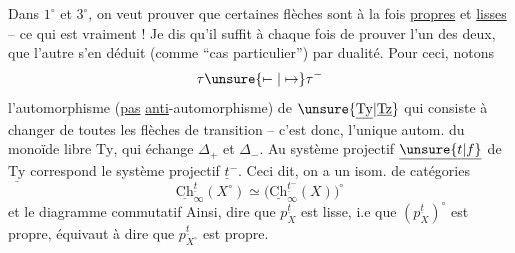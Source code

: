 Dans $1^\circ$ et $3^\circ$, on veut prouver que certaines flèches
 sont à la fois \uline{propres} et \uline{lisses} -- ce qui est vraiment
 ! Je dis qu'il suffit à chaque fois de
prouver l'un des deux, que l'autre s'en déduit
(comme ``cas particulier'') par dualité. Pour ceci,
notons
\[
\tau\unsure{\mapstochar\relbar|\mapsto}\tau^{-}
\]
l'automorphisme (\uline{pas} \uline{anti}-automorphisme) de
$\unsure{\underline{\mathrm{Ty}}|\underline{\mathrm{Tz}}}$ qui consiste à changer de  toutes les
flèches de transition -- c'est donc,  l'unique
autom. du monoïde libre $\mathrm{Ty}$, qui échange
$\Delta_+$ et $\Delta_-$. Au système projectif $\underline{\unsure{t|f}}$ de $\underline{\mathrm{Ty}}$
correspond le système projectif $\underline t^{-}$. Ceci
dit, on a un isom. de catégories
\[
\boxed{\underline{\mathrm{Ch}}_{\infty}^{\underline t}(X^{\circ})
\simeq\bigl(\underline{\mathrm{Ch}}_{\infty}^{\underline t^{-}}(X)\bigr)^{\circ}}
\]
et  le diagramme commutatif
Ainsi, dire que $p^{\underline t}_X$ est lisse, i.e que
$(p^{\underline t}_X)^{\circ}$ est propre, équivaut à dire que $p^{\underline t}_{X^{\circ}}$ est
propre.
